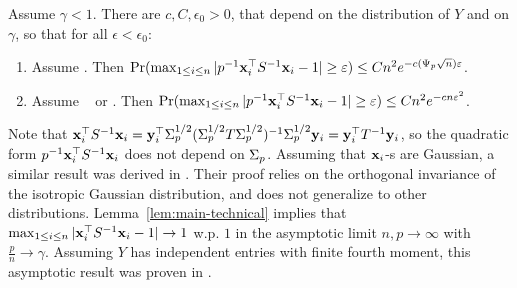 \documentclass[times,sort&compress,3p]{elsarticle}
\begin{document}
\begin{lemma}\label{lem:main-technical}
    Assume  $\gamma<1$. There are 
        $c,C,\epsilon_0>0$, that depend on the distribution of $Y$ and on $\gamma$, so that for all $\epsilon<\epsilon_0$: 
        
        \begin{enumerate}
                
                \item 
                Assume \AssumLC. Then
                $\Pr(\max_{1\le i\le n}|p^{-1}{\bf x}_i^\top S^{-1}{\bf x}_i - 1|\ge \varepsilon) \le Cn^2e^{-c(\Psi_p\sqrt{n}) \varepsilon}$.
                
                
                \item 
                Assume \AssumIndep~ or \AssumCCPSB. Then 
                $\Pr(\max_{1\le i\le n}|p^{-1}{\bf x}_i^\top S^{-1}{\bf x}_i - 1|\ge \varepsilon) \le C n^2 e^{-cn\varepsilon^2}$.
        \end{enumerate}
\end{lemma}
Note that ${\bf x}_i^\top S^{-1}{\bf x}_i = {\bf y}_i^\top \Sigma_p^{1/2}(\Sigma_p^{1/2}T\Sigma_p^{1/2})^{-1}\Sigma_p^{1/2}{\bf y}_i={\bf y}_i^\top T^{-1}{\bf y}_i$, so the quadratic form $p^{-1}{\bf x}_i^\top S^{-1}{\bf x}_i$ does not depend on $\Sigma_p$. 
Assuming that ${\bf x}_i$-s are Gaussian, a similar result 
was derived 
in \cite{zhang2016marvcenko}.
Their proof relies on the orthogonal invariance of the isotropic Gaussian distribution, and does not generalize to other distributions.
Lemma~\ref{lem:main-technical} implies
that 
$\max_{1\le i\le n}|{\bf x}_i^\top S^{-1} {\bf x}_i-1|\to 1$ w.p. $1$ in the asymptotic limit $n,p\to\infty$ with $\frac{p}{n}\to \gamma$.
Assuming $Y$ has independent entries with finite fourth moment, this asymptotic result was proven in \cite{couillet2014robust}.    
\end{document}
